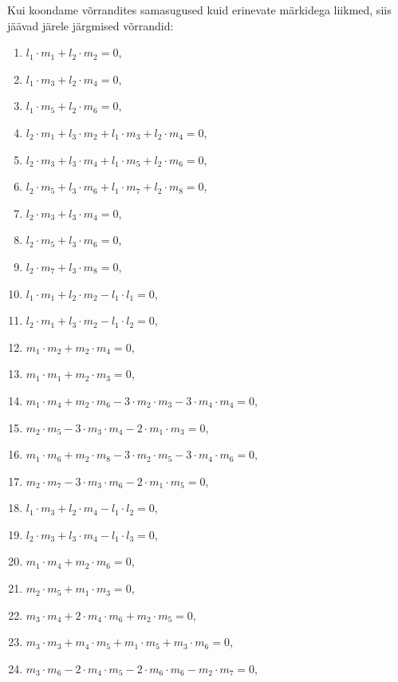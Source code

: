 Kui koondame võrrandites samasugused kuid erinevate märkidega liikmed, siis
jäävad järele järgmised võrrandid:
\begin{enumerate}
    \item $l_1 \cdot m_1 + l_2 \cdot m_2 = 0$,
    \item $l_1 \cdot m_3 + l_2 \cdot m_4 = 0$,
    \item $l_1 \cdot m_5 + l_2 \cdot m_6 = 0$,
    \item $l_2 \cdot m_1 + l_3 \cdot m_2 + l_1 \cdot m_3 + l_2 \cdot m_4 = 0$,
    \item $l_2 \cdot m_3 + l_3 \cdot m_4 + l_1 \cdot m_5 + l_2 \cdot m_6 = 0$,
    \item $l_2 \cdot m_5 + l_3 \cdot m_6 + l_1 \cdot m_7 + l_2 \cdot m_8 = 0$,
    \item $l_2 \cdot m_3 + l_3 \cdot m_4 = 0$,
    \item $l_2 \cdot m_5 + l_3 \cdot m_6 = 0$,
    \item $l_2 \cdot m_7 + l_3 \cdot m_8 = 0$,
    \item $l_1 \cdot m_1 + l_2 \cdot m_2 - l_1 \cdot l_1 = 0$,
    \item $l_2 \cdot m_1 + l_3 \cdot m_2 - l_1 \cdot l_2 = 0$,
    \item $m_1 \cdot m_2 + m_2 \cdot m_4 = 0$,
    \item $m_1 \cdot m_1 + m_2 \cdot m_3 = 0$,
    \item $m_1 \cdot m_4 + m_2 \cdot m_6 - 3 \cdot m_2 \cdot m_3 - 3 \cdot m_4 \cdot m_4 = 0$,
    \item $m_2 \cdot m_5 - 3 \cdot m_3 \cdot m_4 - 2 \cdot m_1 \cdot m_3 = 0$,
    \item $m_1 \cdot m_6 + m_2 \cdot m_8 - 3 \cdot m_2 \cdot m_5 - 3 \cdot m_4 \cdot m_6 = 0$,
    \item $m_2 \cdot m_7 - 3 \cdot m_3 \cdot m_6 - 2 \cdot m_1 \cdot m_5 = 0$,
    \item $l_1 \cdot m_3 + l_2 \cdot m_4 - l_1 \cdot l_2 = 0$,
    \item $l_2 \cdot m_3 + l_3 \cdot m_4 - l_1 \cdot l_3 = 0$,
    \item $m_1 \cdot m_4 + m_2 \cdot m_6 = 0$,
    \item $m_2 \cdot m_5 + m_1 \cdot m_3 = 0$,
    \item $m_3 \cdot m_4 + 2 \cdot m_4 \cdot m_6 + m_2 \cdot m_5 = 0$,
    \item $m_3 \cdot m_3 + m_4 \cdot m_5 + m_1 \cdot m_5 + m_3 \cdot m_6 = 0$,
    \item $m_3 \cdot m_6 - 2 \cdot m_4 \cdot m_5 - 2 \cdot m_6 \cdot m_6 - m_2 \cdot m_7 = 0$,

\end{enumerate}
